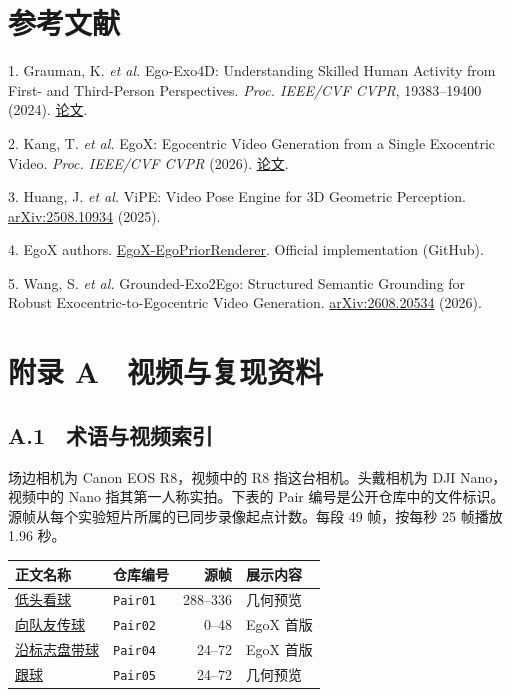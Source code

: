 \documentclass[UTF8,a4paper,11pt,fontset=fandol]{ctexart}
\begin{document}
\section*{参考文献}
\begingroup\small\setlength{\parindent}{0pt}\setlength{\parskip}{.32em}
1. Grauman, K. \textit{et al.} Ego-Exo4D: Understanding Skilled Human Activity from First- and Third-Person Perspectives. \textit{Proc. IEEE/CVF CVPR}, 19383–19400 (2024). \href{https://openaccess.thecvf.com/content/CVPR2024/html/Grauman_Ego-Exo4D_Understanding_Skilled_Human_Activity_from_First-_and_Third-Person_Perspectives_CVPR_2024_paper.html}{论文}.

2. Kang, T. \textit{et al.} EgoX: Egocentric Video Generation from a Single Exocentric Video. \textit{Proc. IEEE/CVF CVPR} (2026). \href{https://arxiv.org/abs/2512.08269}{论文}.

3. Huang, J. \textit{et al.} ViPE: Video Pose Engine for 3D Geometric Perception. \href{https://arxiv.org/abs/2508.10934}{arXiv:2508.10934} (2025).

4. EgoX authors. \href{https://github.com/kdh8156/EgoX-EgoPriorRenderer}{EgoX-EgoPriorRenderer}. Official implementation (GitHub).

5. Wang, S. \textit{et al.} Grounded-Exo2Ego: Structured Semantic Grounding for Robust Exocentric-to-Egocentric Video Generation. \href{https://arxiv.org/abs/2608.20534}{arXiv:2608.20534} (2026).
\endgroup

\newpage
\section*{附录 A　视频与复现资料}

\subsection*{A.1　术语与视频索引}
场边相机为 Canon EOS R8，视频中的 R8 指这台相机。头戴相机为 DJI Nano，视频中的 Nano 指其第一人称实拍。下表的 Pair 编号是公开仓库中的文件标识。源帧从每个实验短片所属的已同步录像起点计数。每段 49 帧，按每秒 25 帧播放 1.96 秒。

\smallskip
\noindent\begin{tabularx}{\linewidth}{@{}Xlrl@{}}
\toprule
正文名称 & 仓库编号 & 源帧 & 展示内容\\
\midrule
\href{https://cyclotr0nzxj.github.io/football-egox/\#pair01}{低头看球} & \texttt{Pair01} & 288–336 & 几何预览\\
\href{https://cyclotr0nzxj.github.io/football-egox/\#pair02}{向队友传球} & \texttt{Pair02} & 0–48 & EgoX 首版\\
\href{https://cyclotr0nzxj.github.io/football-egox/\#pair04}{沿标志盘带球} & \texttt{Pair04} & 24–72 & EgoX 首版\\
\href{https://cyclotr0nzxj.github.io/football-egox/\#pair05}{跟球} & \texttt{Pair05} & 24–72 & 几何预览\\
\bottomrule
\end{tabularx}
\end{document}
